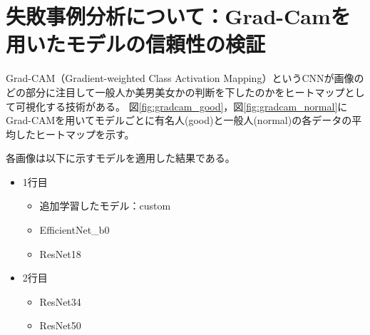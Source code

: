 \documentclass[a4paper,11pt,titlepage]{jsarticle}
\begin{document}
\section{失敗事例分析について：Grad-Camを用いたモデルの信頼性の検証}
Grad-CAM（Gradient-weighted Class Activation Mapping）というCNNが画像のどの部分に注目して一般人か美男美女かの判断を下したのかをヒートマップとして可視化する技術がある。
図\ref{fig:gradcam_good}，図\ref{fig:gradcam_normal}にGrad-CAMを用いてモデルごとに有名人(good)と一般人(normal)の各データの平均したヒートマップを示す。

各画像は以下に示すモデルを適用した結果である。
\begin{itemize}
	\item 1行目
	\begin{itemize}
	\item 追加学習したモデル：custom
	\item EfficientNet\_b0
	\item ResNet18
	\end{itemize}
	\item 2行目
	\begin{itemize}
	\item ResNet34
	\item ResNet50
	\end{itemize}
\end{itemize}
\end{document}

